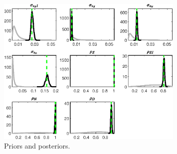  
\begin{figure}[H]
\centering
\includegraphics[width=0.80\textwidth]{BRS_fd/Output/BRS_fd_PriorsAndPosteriors1}
\caption{Priors and posteriors.}\label{Fig:PriorsAndPosteriors:1}
\end{figure}
 
